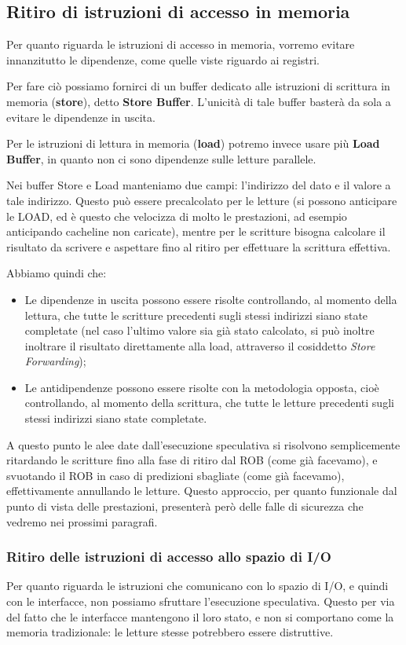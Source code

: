 \documentclass[a4paper,11pt]{article}
\begin{document}
\subsection{Ritiro di istruzioni di accesso in memoria}
Per quanto riguarda le istruzioni di accesso in memoria, vorremo evitare innanzitutto le dipendenze, come quelle viste riguardo ai registri.

Per fare ciò possiamo fornirci di un buffer dedicato alle istruzioni di scrittura in memoria (\textbf{store}), detto \textbf{Store Buffer}. L'unicità di tale buffer basterà da sola a evitare le dipendenze in uscita.  

Per le istruzioni di lettura in memoria (\textbf{load}) potremo invece usare più \textbf{Load Buffer}, in quanto non ci sono dipendenze sulle letture parallele.


Nei buffer Store e Load manteniamo due campi: l'indirizzo del dato e il valore a tale indirizzo. Questo può essere precalcolato per le letture (si possono anticipare le LOAD, ed è questo che velocizza di molto le prestazioni, ad esempio anticipando cacheline non caricate), mentre per le scritture bisogna calcolare il risultato da scrivere e aspettare fino al ritiro per effettuare la scrittura effettiva.

Abbiamo quindi che:
\begin{itemize}
	\item Le dipendenze in uscita possono essere risolte controllando, al momento della lettura, che tutte le scritture precedenti sugli stessi indirizzi siano state completate (nel caso l'ultimo valore sia già stato calcolato, si può inoltre inoltrare il risultato direttamente alla load, attraverso il cosiddetto \textit{Store Forwarding});
	\item Le antidipendenze possono essere risolte con la metodologia opposta, cioè controllando, al momento della scrittura, che tutte le letture precedenti sugli stessi indirizzi siano state completate.
\end{itemize}

A questo punto le alee date dall'esecuzione speculativa si risolvono semplicemente ritardando le scritture fino alla fase di ritiro dal ROB (come già facevamo), e svuotando il ROB in caso di predizioni sbagliate (come già facevamo), effettivamente annullando le letture.
Questo approccio, per quanto funzionale dal punto di vista delle prestazioni, presenterà però delle falle di sicurezza che vedremo nei prossimi paragrafi.

\subsubsection{Ritiro delle istruzioni di accesso allo spazio di I/O}
Per quanto riguarda le istruzioni che comunicano con lo spazio di I/O, e quindi con le interfacce, non possiamo sfruttare l'esecuzione speculativa. Questo per via del fatto che le interfacce mantengono il loro stato, e non si comportano come la memoria tradizionale: le letture stesse potrebbero essere distruttive. 
\end{document}

